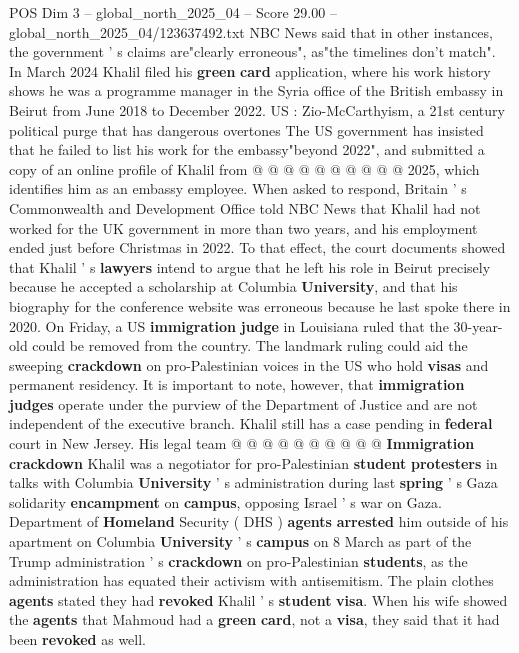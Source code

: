 \begin{textsample}{POS Dim 3 – global\_north\_2025\_04 – Score 29.00 – global\_north\_2025\_04/123637492.txt}
NBC News said that in other instances, the government ' s claims are"clearly erroneous", as"the timelines don't match".
In March 2024 Khalil filed his \textbf{green} \textbf{card} application, where his work history shows he was a programme manager in the Syria office of the British embassy in Beirut from June 2018 to December 2022.
US : Zio-McCarthyism, a 21st century political purge that has dangerous overtones The US government has insisted that he failed to list his work for the embassy"beyond 2022", and submitted a copy of an online profile of Khalil from @ @ @ @ @ @ @ @ @ @ 2025, which identifies him as an embassy employee.
When asked to respond, Britain ' s Commonwealth and Development Office told NBC News that Khalil had not worked for the UK government in more than two years, and his employment ended just before Christmas in 2022.
To that effect, the court documents showed that Khalil ' s \textbf{lawyers} intend to argue that he left his role in Beirut precisely because he accepted a scholarship at Columbia \textbf{University}, and that his biography for the conference website was erroneous because he last spoke there in 2020.
On Friday, a US \textbf{immigration} \textbf{judge} in Louisiana ruled that the 30-year-old could be removed from the country.
The landmark ruling could aid the sweeping \textbf{crackdown} on pro-Palestinian voices in the US who hold \textbf{visas} and permanent residency.
It is important to note, however, that \textbf{immigration} \textbf{judges} operate under the purview of the Department of Justice and are not independent of the executive branch.
Khalil still has a case pending in \textbf{federal} court in New Jersey.
His legal team @ @ @ @ @ @ @ @ @ @ \textbf{Immigration} \textbf{crackdown} Khalil was a negotiator for pro-Palestinian \textbf{student} \textbf{protesters} in talks with Columbia \textbf{University} ' s administration during last \textbf{spring} ' s Gaza solidarity \textbf{encampment} on \textbf{campus}, opposing Israel ' s war on Gaza.
Department of \textbf{Homeland} Security ( DHS ) \textbf{agents} \textbf{arrested} him outside of his apartment on Columbia \textbf{University} ' s \textbf{campus} on 8 March as part of the Trump administration ' s \textbf{crackdown} on pro-Palestinian \textbf{students}, as the administration has equated their activism with antisemitism.
The plain clothes \textbf{agents} stated they had \textbf{revoked} Khalil ' s \textbf{student} \textbf{visa}.
When his wife showed the \textbf{agents} that Mahmoud had a \textbf{green} \textbf{card}, not a \textbf{visa}, they said that it had been \textbf{revoked} as well.

\end{textsample}
